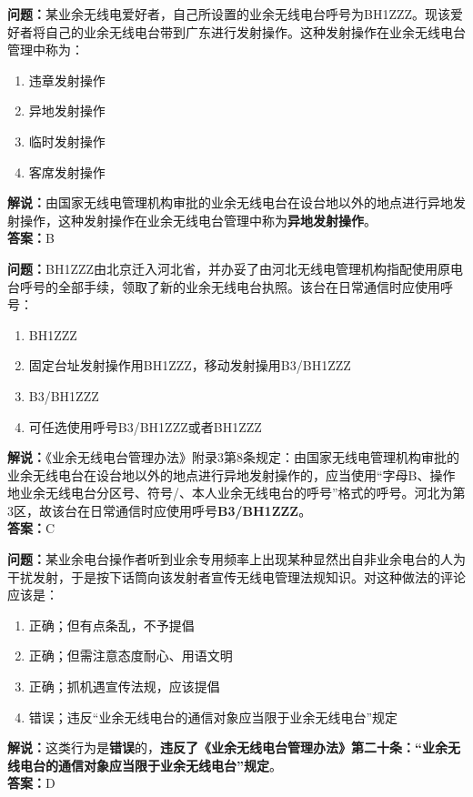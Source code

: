\bigskip


\noindent\textbf{问题：}某业余无线电爱好者，自己所设置的业余无线电台呼号为BH1ZZZ。现该爱好者将自己的业余无线电台带到广东进行发射操作。这种发射操作在业余无线电台管理中称为：
\begin{enumerate}[label=\Alph*), leftmargin=3em]
	\item 违章发射操作
	\item 异地发射操作
	\item 临时发射操作
	\item 客席发射操作
\end{enumerate}
\noindent\textbf{解说：}由国家无线电管理机构审批的业余无线电台在设台地以外的地点进行异地发射操作，这种发射操作在业余无线电台管理中称为\textbf{异地发射操作}。\\\noindent\textbf{答案：}B





\bigskip


\noindent\textbf{问题：}BH1ZZZ由北京迁入河北省，并办妥了由河北无线电管理机构指配使用原电台呼号的全部手续，领取了新的业余无线电台执照。该台在日常通信时应使用呼号：
\begin{enumerate}[label=\Alph*), leftmargin=3em]
	\item BH1ZZZ
	\item 固定台址发射操作用BH1ZZZ，移动发射操用B3/BH1ZZZ
	\item B3/BH1ZZZ
	\item 可任选使用呼号B3/BH1ZZZ或者BH1ZZZ
\end{enumerate}
\noindent\textbf{解说：}《业余无线电台管理办法》附录3第8条规定：由国家无线电管理机构审批的业余无线电台在设台地以外的地点进行异地发射操作的，应当使用“字母B、操作地业余无线电台分区号、符号/、本人业余无线电台的呼号”格式的呼号。河北为第3区，故该台在日常通信时应使用呼号\textbf{B3/BH1ZZZ}。\\\noindent\textbf{答案：}C



\bigskip


\noindent\textbf{问题：}某业余电台操作者听到业余专用频率上出现某种显然出自非业余电台的人为干扰发射，于是按下话筒向该发射者宣传无线电管理法规知识。对这种做法的评论应该是：
\begin{enumerate}[label=\Alph*), leftmargin=3em]
	\item 正确；但有点条乱，不予提倡
	\item 正确；但需注意态度耐心、用语文明
	\item 正确；抓机遇宣传法规，应该提倡
	\item 错误；违反“业余无线电台的通信对象应当限于业余无线电台”规定
\end{enumerate}
\noindent\textbf{解说：}这类行为是\textbf{错误}的，\textbf{违反了《业余无线电台管理办法》第二十条：“业余无线电台的通信对象应当限于业余无线电台”规定}。\\\noindent\textbf{答案：}D



